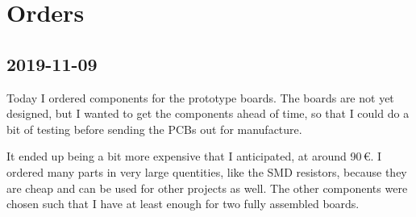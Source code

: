 \documentclass[a4paper]{article}
\begin{document}
\section{Orders}

\subsection{2019-11-09}

Today I ordered components for the prototype boards. The boards are not yet designed, but I wanted to get the components ahead of time, so that I could do a bit of testing before sending the PCBs out for manufacture.

It ended up being a bit more expensive that I anticipated, at around 90\,€. I ordered many parts in very large quentities, like the SMD resistors, because they are cheap and can be used for other projects as well. The other components were chosen such that I have at least enough for two fully assembled boards. 
\end{document}
